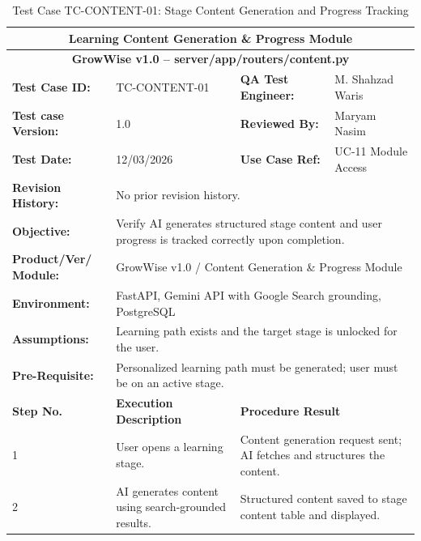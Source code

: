 \documentclass{FastFyp}
\begin{document}
\vspace{0.5em}

\begin{table}[H]
\footnotesize
\centering
\caption{Test Case TC-CONTENT-01: Stage Content Generation and Progress Tracking}
\label{tab:tccontent}
\begin{tabular}{|p{2.5cm}|p{4cm}|p{2.5cm}|p{4.5cm}|}
\hline
\multicolumn{4}{|c|}{\textbf{Learning Content Generation \& Progress Module}} \\ \hline
\multicolumn{4}{|c|}{\textbf{GrowWise v1.0 -- server/app/routers/content.py}} \\ \hline
\textbf{Test Case ID:} & TC-CONTENT-01 & \textbf{QA Test Engineer:} & M. Shahzad Waris \\ \hline
\textbf{Test case Version:} & 1.0 & \textbf{Reviewed By:} & Maryam Nasim \\ \hline
\textbf{Test Date:} & 12/03/2026 & \textbf{Use Case Ref:} & UC-11 Module Access \\ \hline
\textbf{Revision History:} & \multicolumn{3}{p{11cm}|}{No prior revision history.} \\ \hline
\textbf{Objective:} & \multicolumn{3}{p{11cm}|}{Verify AI generates structured stage content and user progress is tracked correctly upon completion.} \\ \hline
\textbf{Product/Ver/ Module:} & \multicolumn{3}{p{11cm}|}{GrowWise v1.0 / Content Generation \& Progress Module} \\ \hline
\textbf{Environment:} & \multicolumn{3}{p{11cm}|}{FastAPI, Gemini API with Google Search grounding, PostgreSQL} \\ \hline
\textbf{Assumptions:} & \multicolumn{3}{p{11cm}|}{Learning path exists and the target stage is unlocked for the user.} \\ \hline
\textbf{Pre-Requisite:} & \multicolumn{3}{p{11cm}|}{Personalized learning path must be generated; user must be on an active stage.} \\ \hline
\textbf{Step No.} & \textbf{Execution Description} & \multicolumn{2}{p{7cm}|}{\textbf{Procedure Result}} \\ \hline
1 & User opens a learning stage. & \multicolumn{2}{p{7cm}|}{Content generation request sent; AI fetches and structures the content.} \\ \hline
2 & AI generates content using search-grounded results. & \multicolumn{2}{p{7cm}|}{Structured content saved to stage content table and displayed.} \\ \hline

\end{tabular}
\end{table}
\end{document}
